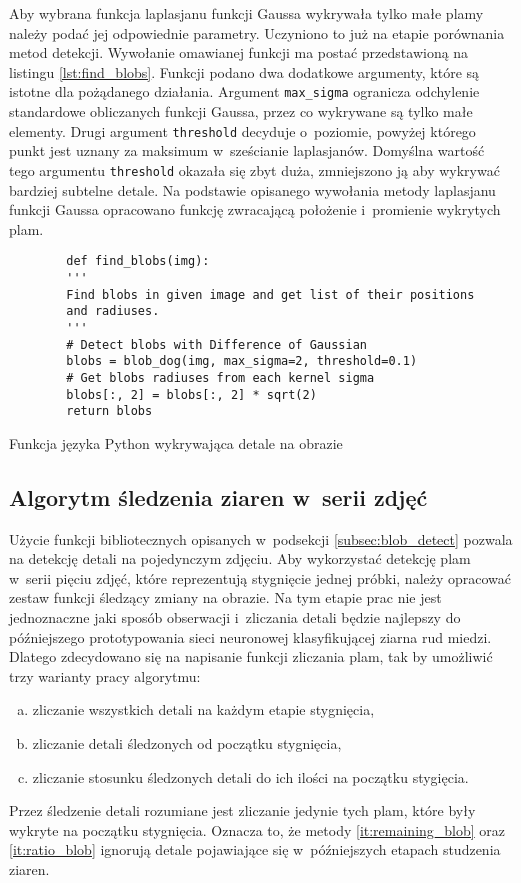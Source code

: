 Aby wybrana funkcja laplasjanu funkcji Gaussa wykrywała tylko małe plamy
należy podać jej odpowiednie parametry.
Uczyniono to już na etapie porównania metod detekcji.
Wywołanie omawianej funkcji ma postać przedstawioną na listingu
\ref{lst:find_blobs}.
Funkcji podano dwa dodatkowe argumenty, które są istotne dla pożądanego
działania.
Argument \texttt{max_sigma} ogranicza odchylenie standardowe
obliczanych funkcji Gaussa, przez co wykrywane są tylko małe elementy.
Drugi argument \texttt{threshold} decyduje o~poziomie,
powyżej którego punkt jest uznany za maksimum w~sześcianie laplasjanów.
Domyślna wartość tego argumentu \texttt{threshold} okazała
się zbyt duża, zmniejszono ją aby wykrywać bardziej subtelne detale.
Na podstawie opisanego wywołania metody laplasjanu funkcji Gaussa
opracowano funkcję zwracającą położenie i~promienie wykrytych plam.
\begin{listing}[htb]
	\begin{verbatim}
		def find_blobs(img):
		'''
		Find blobs in given image and get list of their positions
		and radiuses.
		'''
		# Detect blobs with Difference of Gaussian
		blobs = blob_dog(img, max_sigma=2, threshold=0.1)
		# Get blobs radiuses from each kernel sigma
		blobs[:, 2] = blobs[:, 2] * sqrt(2)
		return blobs
	\end{verbatim}
	\caption{Funkcja języka Python wykrywająca detale na obrazie}
	\label{lst:find_blobs}
\end{listing}

\subsection{Algorytm śledzenia ziaren w~serii zdjęć}
\label{subsec:blob_tracking}
Użycie funkcji bibliotecznych opisanych w~podsekcji \ref{subsec:blob_detect}
pozwala na detekcję detali na pojedynczym zdjęciu.
Aby wykorzystać detekcję plam w~serii pięciu zdjęć, które reprezentują
stygnięcie jednej próbki, należy opracować zestaw funkcji śledzący zmiany
na obrazie.
Na tym etapie prac nie jest jednoznaczne jaki sposób obserwacji i~zliczania
detali będzie najlepszy do późniejszego prototypowania sieci neuronowej
klasyfikującej ziarna rud miedzi.
Dlatego zdecydowano się na napisanie funkcji zliczania plam, tak by umożliwić
trzy warianty pracy algorytmu:
\begin{enumerate}[a)]
	\item \label{it:all_blob}
	      zliczanie wszystkich detali na każdym etapie stygnięcia,
	\item \label{it:remaining_blob}
	      zliczanie detali śledzonych od początku stygnięcia,
	\item \label{it:ratio_blob}
	      zliczanie stosunku śledzonych detali do ich ilości na początku
	      stygięcia.
\end{enumerate}
Przez śledzenie detali rozumiane jest zliczanie jedynie tych plam, które
były wykryte na początku stygnięcia.
Oznacza to, że metody \ref{it:remaining_blob} oraz \ref{it:ratio_blob}
ignorują detale pojawiające się w~późniejszych etapach studzenia ziaren.

